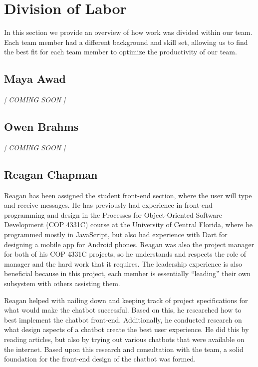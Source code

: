 \documentclass[titlepage, 12pt]{article}
\begin{document}
\pagebreak





\section{Division of Labor}

In this section we provide an overview of how work was divided within our team. Each team member had a different background and skill set, allowing us to find the best fit for each team member to optimize the productivity of our team.

\subsection{Maya Awad}
\begin{center}\emph{[ COMING SOON ]}\end{center}

\subsection{Owen Brahms}
\begin{center}\emph{[ COMING SOON ]}\end{center}

\subsection{Reagan Chapman}

Reagan has been assigned the student front-end section, where the user will type and receive messages. He has previously had experience in front-end programming and design in the Processes for Object-Oriented Software Development (COP 4331C) course at the University of Central Florida, where he programmed mostly in JavaScript, but also had experience with Dart for designing a mobile app for Android phones. Reagan was also the project manager for both of his COP 4331C projects, so he understands and respects the role of manager and the hard work that it requires. The leadership experience is also beneficial because in this project, each member is essentially “leading” their own subsystem with others assisting them.

Reagan helped with nailing down and keeping track of project specifications for what would make the chatbot successful. Based on this, he researched how to best implement the chatbot front-end. Additionally, he conducted research on what design aspects of a chatbot create the best user experience. He did this by reading articles, but also by trying out various chatbots that were available on the internet. Based upon this research and consultation with the team, a solid foundation for the front-end design of the chatbot was formed. 
\end{document}
